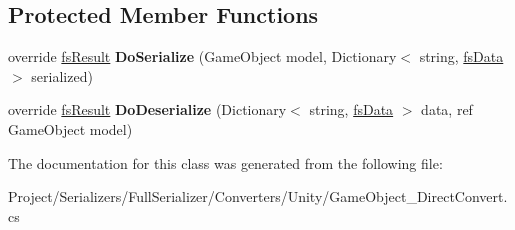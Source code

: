 \subsection*{Protected Member Functions}
\begin{DoxyCompactItemize}
\item 
\mbox{\label{class_full_serializer_1_1_internal_1_1_direct_converters_1_1_game_object___direct_converter_a01655c6b3c484d192362db3a30c27a73}} 
override \hyperlink{struct_full_serializer_1_1fs_result}{fs\+Result} {\bfseries Do\+Serialize} (Game\+Object model, Dictionary$<$ string, \hyperlink{class_full_serializer_1_1fs_data}{fs\+Data} $>$ serialized)
\item 
\mbox{\label{class_full_serializer_1_1_internal_1_1_direct_converters_1_1_game_object___direct_converter_a93134c0f0b5c7d7cdc2449541f031bf3}} 
override \hyperlink{struct_full_serializer_1_1fs_result}{fs\+Result} {\bfseries Do\+Deserialize} (Dictionary$<$ string, \hyperlink{class_full_serializer_1_1fs_data}{fs\+Data} $>$ data, ref Game\+Object model)
\end{DoxyCompactItemize}


The documentation for this class was generated from the following file\+:\begin{DoxyCompactItemize}
\item 
Project/\+Serializers/\+Full\+Serializer/\+Converters/\+Unity/Game\+Object\+\_\+\+Direct\+Convert.\+cs\end{DoxyCompactItemize}
